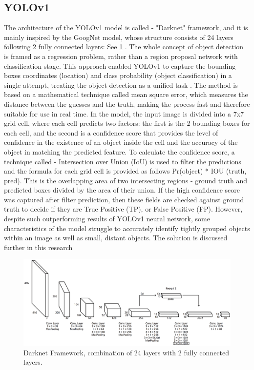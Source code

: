 \begin{multicols}{2}
\subsection{YOLOv1}
The architecture of the YOLOv1 model is called - "Darknet" framework, and it is mainly inspired by the GoogNet model, whose structure consists of 24 layers following 2 fully connected layers: See \ref{fig:Darknet Framework} \citep{redmon2016lookonceunifiedrealtime, Zhou2023}. The whole concept of object detection is framed as a regression problem, rather than a region proposal network with classification stage. This approach enabled YOLOv1 to capture the bounding boxes coordinates (location) and class probability (object classification) in a single attempt, treating the object detection as a unified task \citep{DataCamp2023}. The method is based on a mathematical technique called mean square error, which measures the distance between the guesses and the truth, making the process fast and therefore suitable for use in real time. In the model, the input image is divided into a 7x7 grid cell, where each cell predicts two factors: the first is the 2 bounding boxes for each cell, and the second is a confidence score that provides the level of confidence in the existence of an object inside the cell and the accuracy of the object in matching the predicted feature. To calculate the confidence score, a technique called - Intersection over Union (IoU) is used to filter the predictions and the formula for each grid cell is provided as follows Pr(object) * IOU (truth, pred). This is the overlapping area of two intersecting regions - ground truth and predicted boxes divided by the area of their union. If the high confidence score was captured after filter prediction, then these fields are checked against ground truth to decide if they are True Positive (TP), or False Positive (FP). However, despite such outperforming results of YOLOv1 neural network, some characteristics of the model struggle to accurately identify tightly grouped objects within an image as well as small, distant objects. The solution is discussed further in this research
\end{multicols}

\begin{figure}[ht]
    \centering
    \includegraphics[width=1\linewidth]{datas/Darknet Framework.png}
    \caption{Darknet Framework, combination of 24 layers with 2 fully connected layers.}
    \label{fig:Darknet Framework}
\end{figure}

